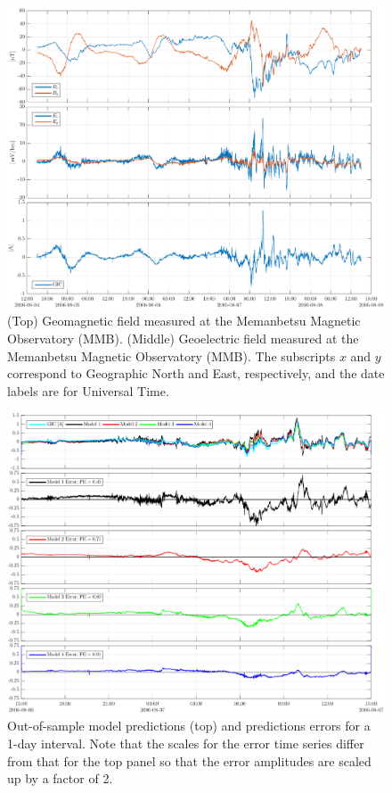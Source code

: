 \documentclass[draft,linenumbers]{agujournal2018}
\begin{document}
\begin{figure}[h]
\centering
\includegraphics[width=\textwidth]{figures/plot_raw_All_20060805.pdf}
\caption{(Top) Geomagnetic field measured at the Memanbetsu Magnetic Observatory (MMB). (Middle) Geoelectric field measured at the Memanbetsu Magnetic Observatory (MMB). The subscripts $x$ and $y$ correspond to Geographic North and East, respectively, and the date labels are for Universal Time.}
\label{sample}
\end{figure}

\begin{figure}[h]
\centering
\includegraphics[width=\textwidth]{figures/plot_model_predictions-MeanModel-2006-08-06.pdf}
\caption{Out-of-sample model predictions (top) and predictions errors for a 1-day interval. Note that the scales for the error time series differ from that for the top panel so that the error amplitudes are scaled up by a factor of 2.}
\label{predictions}
\end{figure}
\end{document}
